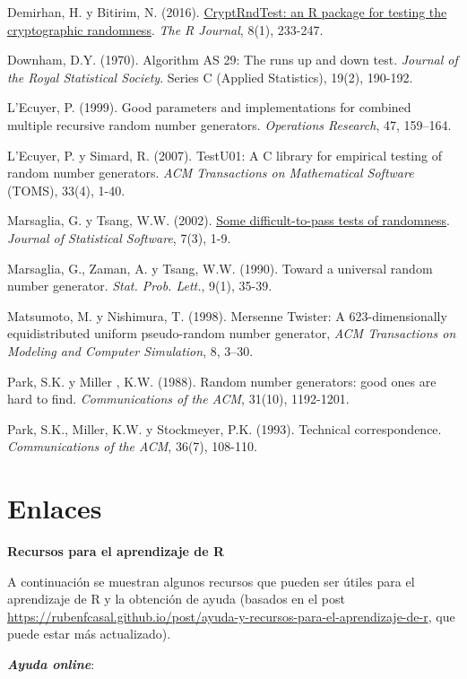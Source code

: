 \documentclass[
]{book}
\theoremstyle{break}
\theoremstyle{definition}
\theoremstyle{definition}
\theoremstyle{definition}
\theoremstyle{remark}
\begin{document}
Demirhan, H. y Bitirim, N. (2016). \href{https://journal.r-project.org/archive/2016/RJ-2016-016/index.html}{CryptRndTest: an R package for testing the cryptographic randomness}.
\emph{The R Journal}, 8(1), 233-247.

Downham, D.Y. (1970). Algorithm AS 29: The runs up and down test. \emph{Journal of the Royal Statistical Society}. Series C (Applied Statistics), 19(2), 190-192.

L'Ecuyer, P. (1999). Good parameters and implementations for combined multiple recursive random number generators. \emph{Operations Research}, 47, 159--164.

L'Ecuyer, P. y Simard, R. (2007). TestU01: A C library for empirical testing of random number generators. \emph{ACM Transactions on Mathematical Software} (TOMS), 33(4), 1-40.

Marsaglia, G. y Tsang, W.W. (2002). \href{http://www.jstatsoft.org/v07/i03}{Some difficult-to-pass tests of randomness}. \emph{Journal of Statistical Software}, 7(3), 1-9.

Marsaglia, G., Zaman, A. y Tsang, W.W. (1990). Toward a universal random number generator. \emph{Stat. Prob. Lett.}, 9(1), 35-39.

Matsumoto, M. y Nishimura, T. (1998). Mersenne Twister: A 623-dimensionally equidistributed uniform pseudo-random number generator, \emph{ACM Transactions on Modeling and Computer Simulation}, 8, 3--30.

Park, S.K. y Miller , K.W. (1988). Random number generators: good ones are hard to find. \emph{Communications of the ACM}, 31(10), 1192-1201.

Park, S.K., Miller, K.W. y Stockmeyer, P.K. (1993). Technical correspondence. \emph{Communications of the ACM}, 36(7), 108-110.

\hypertarget{appendix-apendices}{%
\appendix}


\hypertarget{links}{%
\chapter{Enlaces}\label{links}}

\textbf{Recursos para el aprendizaje de R}

A continuación se muestran algunos recursos que pueden ser útiles para el aprendizaje de R y la obtención de ayuda
(basados en el post \url{https://rubenfcasal.github.io/post/ayuda-y-recursos-para-el-aprendizaje-de-r},
que puede estar más actualizado).

\textbf{\emph{Ayuda online}}:
\end{document}
